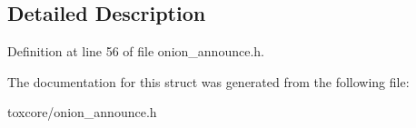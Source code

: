 \subsection{Detailed Description}


Definition at line 56 of file onion\+\_\+announce.\+h.



The documentation for this struct was generated from the following file\+:\begin{DoxyCompactItemize}
\item 
toxcore/onion\+\_\+announce.\+h\end{DoxyCompactItemize}

